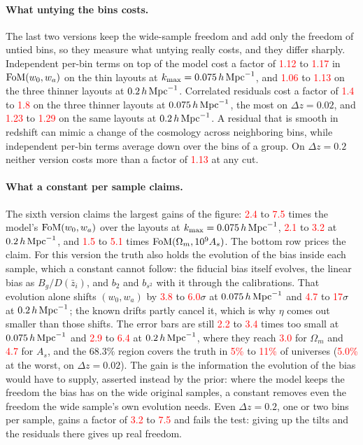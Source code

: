 \documentclass[11pt]{article}
\newcommand{\kmax}{k_{\rm max}}
\newcommand{\hMpc}{\,h\,{\rm Mpc}^{-1}}
\newcommand{\bstwo}{b_{s^2}}
\newif\ifnumbersfinal
\newcommand{\refresh}[1]{\ifnumbersfinal#1\else\textcolor{red}{#1}\fi}
\newcommand{\CostNestedLowMin}{\refresh{1.12}}
\newcommand{\CostNestedLowMax}{\refresh{1.17}}
\newcommand{\CostNestedHighMin}{\refresh{1.06}}
\newcommand{\CostNestedHighMax}{\refresh{1.13}}
\newcommand{\CostCorrLowMin}{\refresh{1.4}}
\newcommand{\CostCorrLowMax}{\refresh{1.8}}
\newcommand{\CostCorrHighMin}{\refresh{1.23}}
\newcommand{\CostCorrHighMax}{\refresh{1.29}}
\newcommand{\CostWideMax}{\refresh{1.13}}
\newcommand{\ConstGainLowMin}{\refresh{2.4}}
\newcommand{\ConstGainLowMax}{\refresh{7.5}}
\newcommand{\ConstGainHighMin}{\refresh{2.1}}
\newcommand{\ConstGainHighMax}{\refresh{3.2}}
\newcommand{\ConstGainTwentyMin}{\refresh{3.2}}
\newcommand{\ConstGainTwentyMax}{\refresh{7.5}}
\newcommand{\ConstGainOmMin}{\refresh{1.5}}
\newcommand{\ConstGainOmMax}{\refresh{5.1}}
\newcommand{\ConstEtaLowMin}{\refresh{2.2}}
\newcommand{\ConstEtaLowMax}{\refresh{3.4}}
\newcommand{\ConstEtaHighMin}{\refresh{2.9}}
\newcommand{\ConstEtaHighMax}{\refresh{6.4}}
\newcommand{\ConstEtaOm}{\refresh{3.0}}
\newcommand{\ConstEtaAs}{\refresh{4.7}}
\newcommand{\ConstCoverMin}{\refresh{5\%}}
\newcommand{\ConstCoverMax}{\refresh{11\%}}
\newcommand{\ConstCoverWorst}{\refresh{5.0\%}}
\newcommand{\ConstEvoLowMin}{\refresh{3.8}}
\newcommand{\ConstEvoLowMax}{\refresh{6.0}}
\newcommand{\ConstEvoHighMin}{\refresh{4.7}}
\newcommand{\ConstEvoHighMax}{\refresh{17}}
\begin{document}
\paragraph{What untying the bins costs.}
The last two versions keep the wide-sample freedom and add only the
freedom of untied bins, so they measure what untying really costs, and
they differ sharply.  Independent per-bin terms on top of the model
cost a factor of \CostNestedLowMin{} to \CostNestedLowMax{} in
${\rm FoM}(w_0, w_a)$ on the thin layouts at $\kmax = 0.075\hMpc$, and
\CostNestedHighMin{} to \CostNestedHighMax{} on the three thinner
layouts at $0.2\hMpc$.  Correlated residuals cost a factor of
\CostCorrLowMin{} to \CostCorrLowMax{} on the three thinner layouts at
$0.075\hMpc$, the most on $\Delta z = 0.02$, and
\CostCorrHighMin{} to \CostCorrHighMax{} on the same layouts at
$0.2\hMpc$.
A residual that is smooth in redshift can mimic a change of the
cosmology across neighboring bins, while independent per-bin terms
average down over the bins of a group.  On $\Delta z = 0.2$ neither
version costs more than a factor of \CostWideMax{} at any cut.

\paragraph{What a constant per sample claims.}
The sixth version claims the largest gains of the figure:
\ConstGainLowMin{} to \ConstGainLowMax{} times the model's
${\rm FoM}(w_0, w_a)$ over the layouts at $\kmax = 0.075\hMpc$,
\ConstGainHighMin{} to \ConstGainHighMax{} at $0.2\hMpc$, and
\ConstGainOmMin{} to \ConstGainOmMax{} times
${\rm FoM}(\Omega_m, 10^9 A_s)$.  The bottom row prices the claim.  For
this version the truth also holds the evolution of the bias inside each
sample, which a constant cannot follow: the fiducial bias itself
evolves, the linear bias as $B_g/D(\bar{z}_i)$, and $b_2$ and $\bstwo$
with it through the calibrations.  That evolution alone shifts
$(w_0, w_a)$ by \ConstEvoLowMin{} to \ConstEvoLowMax{}$\sigma$ at
$0.075\hMpc$ and \ConstEvoHighMin{} to \ConstEvoHighMax{}$\sigma$ at
$0.2\hMpc$; the known drifts partly cancel it, which is why $\eta$
comes out smaller than those shifts.  The error bars are still
\ConstEtaLowMin{} to \ConstEtaLowMax{} times too small at $0.075\hMpc$
and \ConstEtaHighMin{} to \ConstEtaHighMax{} at $0.2\hMpc$, where they
reach \ConstEtaOm{} for $\Omega_m$ and \ConstEtaAs{} for $A_s$, and the
$68.3\%$ region covers the truth in \ConstCoverMin{} to \ConstCoverMax{}
of universes (\ConstCoverWorst{} at the worst, on
$\Delta z = 0.02$).  The
gain is the information the evolution of the bias would have to supply,
asserted instead by the prior: where the model keeps the freedom the
bias has on the wide original samples, a constant removes even the
freedom the wide sample's own evolution needs.  Even $\Delta z = 0.2$,
one or two bins per sample, gains a factor of \ConstGainTwentyMin{} to
\ConstGainTwentyMax{} and fails the test: giving up the tilts and the
residuals there gives up real freedom.
\end{document}
